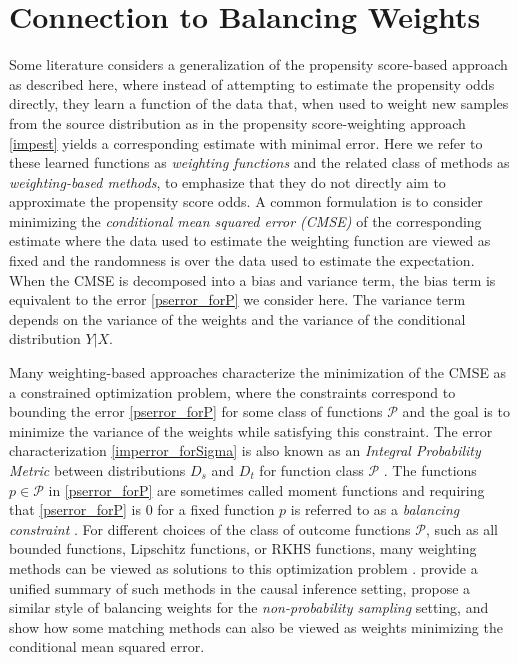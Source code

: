\documentclass{article} %
\begin{document}
\section{Connection to Balancing Weights}
Some literature considers a generalization of the propensity score-based approach as described here, where instead of attempting to estimate the propensity odds directly, they learn a function of the data that, when used to weight new samples from the source distribution as in the propensity score-weighting approach \ref{impest} yields a corresponding estimate with minimal error. Here we refer to these learned functions as \emph{weighting functions} and the related class of methods as \emph{weighting-based methods}, to emphasize that they do not directly aim to approximate the propensity score odds. A common formulation is to consider minimizing the \emph{conditional mean squared error (CMSE)} of the corresponding estimate where the data used to estimate the weighting function are viewed as fixed and the randomness is over the data used to estimate the expectation. When the CMSE is decomposed into a bias and variance term, the bias term is equivalent to the error \ref{pserror_forP} we consider here. The variance term depends on the variance of the weights and the variance of the conditional distribution $Y|X$.

Many weighting-based approaches characterize the minimization of the CMSE as a constrained optimization problem, where the constraints correspond to bounding the error \ref{pserror_forP} for some class of functions $\mathcal{P}$ and the goal is to minimize the variance of the weights while satisfying this constraint. The error characterization \ref{imperror_forSigma} is also known as an \emph{Integral Probability Metric} between distributions $D_s$ and $D_t$ for function class $\mathcal{P}$ \citep{muller1997integral}. The functions $p\in\mathcal{P}$ in \ref{pserror_forP} are sometimes called moment functions and requiring that \ref{pserror_forP} is 0 for a fixed function $p$ is referred to as a \emph{balancing constraint} \citep{zhao2017entropy}. For different choices of the class of outcome functions $\mathcal{P}$, such as all bounded functions, Lipschitz functions, or RKHS functions, many weighting methods can be viewed as solutions to this optimization problem \citep{ben-michael2021balancing}. \cite{ben-michael2021balancing} provide a unified summary of such methods in the causal inference setting, \cite{wang2022functional} propose a similar style of balancing weights for the \emph{non-probability sampling} setting, and \cite{Kallus2020} show how some matching methods can also be viewed as weights minimizing the conditional mean squared error.
\end{document}
